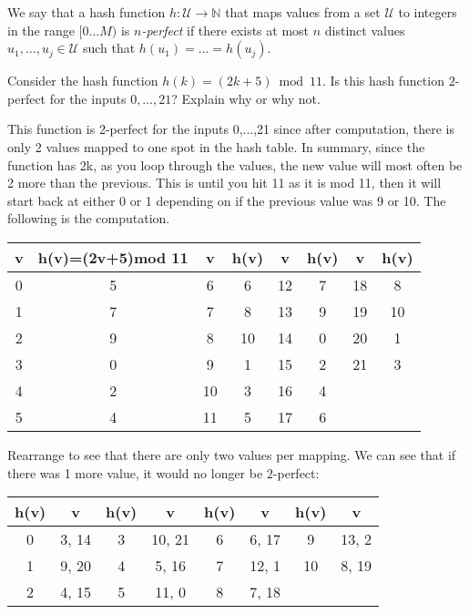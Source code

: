 \begin{problem}
We say that a hash function $h : \mathcal{U} \rightarrow \mathbb{N}$ that maps values from a set $\mathcal{U}$ to integers in the range $[0\dots M)$ is \emph{$n$-perfect} if there exists at most $n$ distinct values $u_1, \dots, u_j \in \mathcal{U}$ such that $h(u_1) = \dots = h(u_j)$.
\begin{questions}
\item Consider the hash function $h(k) = (2k + 5) \bmod 11$. Is this hash function $2$-perfect for the inputs $0, \dots, 21$? Explain why or why not.

This function is 2-perfect for the inputs 0,...,21 since after computation, there is only 2 values mapped to one spot in the hash table. In summary, since the function has 2k, as you loop through the values, the new value will most often be 2 more than the previous. This is until you hit 11 as it is mod 11, then it will start back at either 0 or 1 depending on if the previous value was 9 or 10. The following is the computation.\\

\begin{center}
  \begin{tabular}{||c|c|c|c|c|c|c|c||} 
    \hline
    v & h(v)=(2v+5)mod 11 & v & h(v) & v & h(v) & v & h(v) \\ [0.5ex] 
    \hline\hline
    0 & 5 & 6 & 6 & 12 & 7 & 18 & 8\\ 
    1 & 7 & 7 & 8 & 13 & 9 & 19 & 10 \\
    2 & 9 & 8 & 10 & 14 & 0 & 20 & 1 \\
    3 & 0 & 9 & 1 & 15 & 2 & 21 & 3 \\
    4 & 2 & 10 & 3 & 16 & 4 &  & \\
    5 & 4 & 11 & 5 & 17 & 6 &  & \\ [1ex] 
    \hline
  \end{tabular}
\end{center}

Rearrange to see that there are only two values per mapping. We can see that if there was 1 more value, it would no longer be 2-perfect:

\begin{center}
  \begin{tabular}{||c|c|c|c|c|c|c|c||} 
    \hline
    h(v) & v & h(v) & v & h(v) & v & h(v) & v \\ [0.5ex] 
    \hline\hline
    0 & 3, 14 & 3 & 10, 21 & 6 & 6, 17 & 9 & 13, 2\\ 
    1 & 9, 20 & 4 & 5, 16 & 7 & 12, 1 & 10 & 8, 19 \\
    2 & 4, 15 & 5 & 11, 0 & 8 & 7, 18 &  &  \\ [1ex] 
    \hline
  \end{tabular}
\end{center}



\end{questions}
\end{problem}
